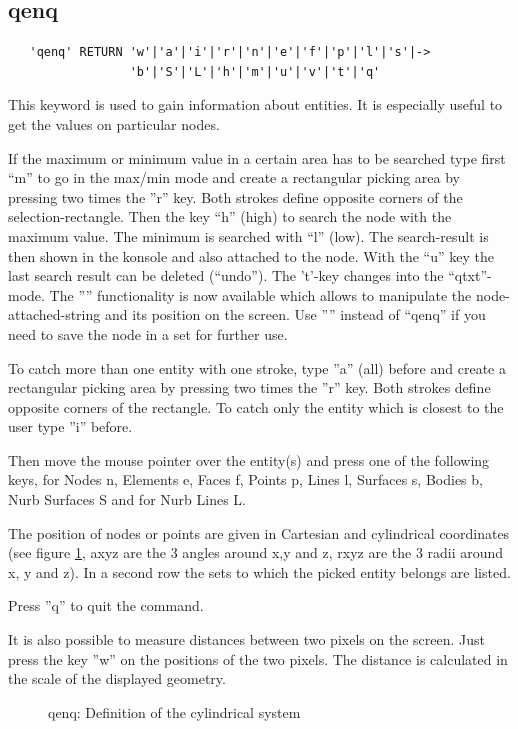 \documentclass{article}
\begin{document}
\subsection{\label{qenq}qenq}
\begin{verbatim}
   'qenq' RETURN 'w'|'a'|'i'|'r'|'n'|'e'|'f'|'p'|'l'|'s'|->
                 'b'|'S'|'L'|'h'|'m'|'u'|'v'|'t'|'q' 
\end{verbatim}
This keyword is used to gain information about entities. It is especially useful to get the values on particular nodes.

If the maximum or minimum value in a certain area has to be searched type first ``m'' to go in the max/min mode and create a rectangular picking area by pressing two times the ''r'' key. Both strokes define opposite corners of the selection-rectangle. Then the key ``h'' (high) to search the node with the maximum value. The minimum is searched with ``l'' (low). The search-result is then shown in the konsole and also attached to the node. With the ``u'' key the last search result can be deleted (``undo''). The 't'-key changes into the ``qtxt''-mode. The '''' functionality is now available which allows to manipulate the node-attached-string and its position on the screen. Use '''' instead of ``qenq'' if you need to save the node in a set for further use.

To catch more than one entity with one stroke, type ''a'' (all) before and create a rectangular picking area by pressing two times the ''r'' key. Both strokes define opposite corners of the rectangle. To catch only the entity which is closest to the user type ''i'' before.

Then move the mouse pointer over the entity(s) and press one of the following keys, for Nodes n, Elements e, Faces f, Points p, Lines l, Surfaces s, Bodies b, Nurb Surfaces S and for Nurb Lines L.

The position of nodes or points are given in Cartesian and cylindrical coordinates (see figure \ref{qenqp}, axyz are the 3 angles around x,y and z, rxyz are the 3 radii around x, y and z). In a second row the sets to which the picked entity belongs are listed. 

Press ''q'' to quit the command. 

It is also possible to measure distances between two pixels on the screen. Just press the key ''w'' on the positions of the two pixels. The distance is calculated in the scale of the displayed geometry.
  
\begin{figure}[h]
\caption{\label{qenqp}qenq: Definition of the cylindrical system}
\end{figure}
\end{document}
